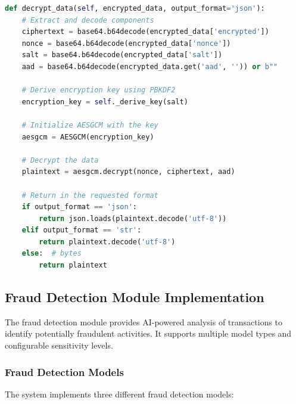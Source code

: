 \documentclass[conference]{IEEEtran}
\begin{document}
\begin{lstlisting}[language=Python, caption=Data Decryption Using Quantum Key]
def decrypt_data(self, encrypted_data, output_format='json'):
    # Extract and decode components
    ciphertext = base64.b64decode(encrypted_data['encrypted'])
    nonce = base64.b64decode(encrypted_data['nonce'])
    salt = base64.b64decode(encrypted_data['salt'])
    aad = base64.b64decode(encrypted_data.get('aad', '')) or b""
    
    # Derive encryption key using PBKDF2
    encryption_key = self._derive_key(salt)
    
    # Initialize AESGCM with the key
    aesgcm = AESGCM(encryption_key)
    
    # Decrypt the data
    plaintext = aesgcm.decrypt(nonce, ciphertext, aad)
    
    # Return in the requested format
    if output_format == 'json':
        return json.loads(plaintext.decode('utf-8'))
    elif output_format == 'str':
        return plaintext.decode('utf-8')
    else:  # bytes
        return plaintext
\end{lstlisting}

\subsection{Fraud Detection Module Implementation}
The fraud detection module provides AI-powered analysis of transactions to identify potentially fraudulent activities. It supports multiple model types and configurable sensitivity levels.

\subsubsection{Fraud Detection Models}
The system implements three different fraud detection models:
\end{document}
